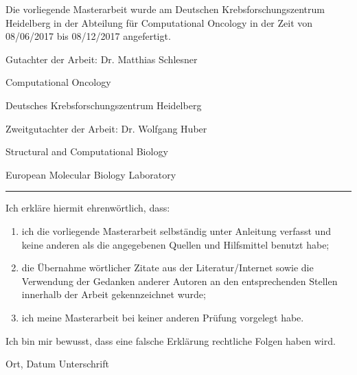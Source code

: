 \begin{titlepage}

Die vorliegende Masterarbeit wurde am Deutschen Krebsforschungszentrum Heidelberg in der Abteilung für Computational Oncology in der Zeit von 08/06/2017 bis 08/12/2017 angefertigt.\par
\vspace{2.5cm}
Gutachter der Arbeit: \hspace*{12mm}	 Dr. Matthias Schlesner\par
					\hspace*{54mm}	Computational Oncology\par
					\hspace*{54mm}	Deutsches Krebsforschungszentrum Heidelberg\par
\vspace{1cm}
Zweitgutachter der Arbeit: \noindent\hspace*{3mm}	
Dr. Wolfgang Huber\par
\noindent\hspace*{56mm}Structural and Computational Biology\par
\noindent\hspace*{56mm}European Molecular Biology Laboratory \par
\vspace{2.5cm}
\hrule
\vspace{1.5cm}
Ich erkläre hiermit ehrenwörtlich, dass:
\begin{enumerate}
\item ich die vorliegende Masterarbeit selbständig unter Anleitung verfasst und keine anderen als die angegebenen Quellen und Hilfsmittel benutzt habe;
\item die Übernahme wörtlicher Zitate aus der Literatur/Internet sowie die Verwendung der Gedanken anderer Autoren an den entsprechenden Stellen innerhalb der Arbeit gekennzeichnet wurde;
\item ich meine Masterarbeit bei keiner anderen Prüfung vorgelegt habe.
\end{enumerate}
\vspace{0.25cm}
Ich bin mir bewusst, dass eine falsche Erklärung rechtliche Folgen haben wird. \par

\vspace{3.5cm}


Ort, Datum \hspace*{40mm}			Unterschrift\par


\end{titlepage}
\cleardoublepage
\onehalfspacing

